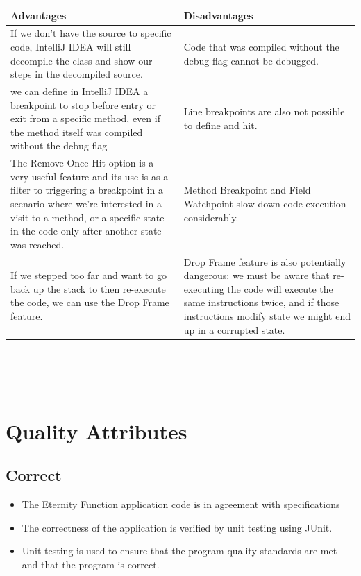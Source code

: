\documentclass[11pt, english]{report}
\begin{document}
\setlength{\tabcolsep}{18pt}
\renewcommand{\arraystretch}{1.5}
\begin{tabular}{ |p{6cm}|p{6cm}| }
\hline
\textbf{Advantages} & \textbf{Disadvantages}\\ \hline 
If we don't have the source to specific code, IntelliJ IDEA will still decompile the class and show our steps in the decompiled source.
 & Code that was compiled without the debug flag cannot be debugged.\\
\hline
we can define in IntelliJ IDEA a breakpoint to stop before entry or exit from a specific method, even if the method itself was compiled without the debug flag & Line breakpoints are also not possible to define and hit.\\
\hline
The Remove Once Hit option is a very useful feature and its use is as a filter to triggering a breakpoint in a scenario where we're interested in a visit to a method, or a specific state in the code only after another state was reached.  & Method Breakpoint and Field Watchpoint slow down code execution considerably.\\
\hline
If we stepped too far and want to go back up the stack to then re-execute the code, we can use the Drop Frame feature. & Drop Frame feature is also potentially dangerous: we must be aware that re-executing the code will execute the same instructions twice, and if those instructions modify state we might end up in a corrupted state.\\
\hline
\end{tabular} \\ \\ \\ 

\section{Quality Attributes}

\subsection{Correct}

\begin{itemize}
    \item The Eternity Function application code is in agreement with specifications
    \item The correctness of the application is verified by unit testing using JUnit.
    \item Unit testing is used to ensure that the program quality standards are met and that the program is correct.
\end{itemize}
\end{document}

